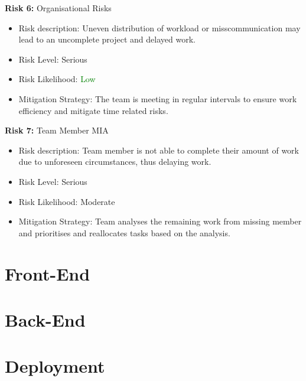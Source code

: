 \documentclass{article}
\begin{document}
\textbf{Risk 6:} Organisational Risks
\begin{itemize}
    \item Risk description: Uneven distribution of workload or misscommunication may lead to an uncomplete project and delayed work. 
    \item Risk Level: \textcolor{BurntOrange}{Serious}
    \item Risk Likelihood: \textcolor{Green}{Low}
    \item Mitigation Strategy: The team is meeting in regular intervals to ensure work efficiency and mitigate time related risks.
\end{itemize}

\textbf{Risk 7:} Team Member MIA
\begin{itemize}
    \item Risk description: Team member is not able to complete their amount of work due to unforeseen circumstances, thus delaying work. 
    \item Risk Level: \textcolor{BurntOrange}{Serious}
    \item Risk Likelihood: \textcolor{BurntOrange}{Moderate}
    \item Mitigation Strategy: Team analyses the remaining work from missing member and prioritises and reallocates tasks based on the analysis. 
\end{itemize}

\section{Front-End}

\section{Back-End}

\section{Deployment}
\end{document}
